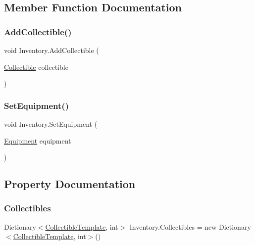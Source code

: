 \subsection{Member Function Documentation}
\mbox{\label{class_inventory_aa38bdf60c64fba830e494a30c9740383}} 
\subsubsection{\texorpdfstring{Add\+Collectible()}{AddCollectible()}}
{\footnotesize\ttfamily void Inventory.\+Add\+Collectible (\begin{DoxyParamCaption}\item[{\mbox{\hyperlink{class_collectible}{Collectible}}}]{collectible }\end{DoxyParamCaption})}

\mbox{\label{class_inventory_acdcf6c26c9b9be07d53c2f72cc868dc4}} 
\subsubsection{\texorpdfstring{Set\+Equipment()}{SetEquipment()}}
{\footnotesize\ttfamily void Inventory.\+Set\+Equipment (\begin{DoxyParamCaption}\item[{\mbox{\hyperlink{class_equipment}{Equipment}}}]{equipment }\end{DoxyParamCaption})}



\subsection{Property Documentation}
\mbox{\label{class_inventory_a6b55b68014aa7272addad95357875072}} 
\subsubsection{\texorpdfstring{Collectibles}{Collectibles}}
{\footnotesize\ttfamily Dictionary$<$\mbox{\hyperlink{class_collectible_template}{Collectible\+Template}}, int$>$ Inventory.\+Collectibles = new Dictionary$<$\mbox{\hyperlink{class_collectible_template}{Collectible\+Template}}, int$>$()\hspace{0.3cm}{\ttfamily [get]}}

